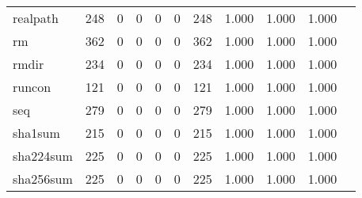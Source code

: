 \begin{longtable}{lp{1.10cm}p{1.10cm}p{1.10cm}p{1.10cm}p{1.10cm}p{1.10cm}p{1.10cm}p{1.10cm}p{1.10cm}p{1.10cm}}
realpath  &                    248 &                                  0 &                                 0 &                                0 &                                 0 &                             248 &                             1.000 &                                 1.000 &                               1.000 \\
rm        &                    362 &                                  0 &                                 0 &                                0 &                                 0 &                             362 &                             1.000 &                                 1.000 &                               1.000 \\
rmdir     &                    234 &                                  0 &                                 0 &                                0 &                                 0 &                             234 &                             1.000 &                                 1.000 &                               1.000 \\
runcon    &                    121 &                                  0 &                                 0 &                                0 &                                 0 &                             121 &                             1.000 &                                 1.000 &                               1.000 \\
seq       &                    279 &                                  0 &                                 0 &                                0 &                                 0 &                             279 &                             1.000 &                                 1.000 &                               1.000 \\
sha1sum   &                    215 &                                  0 &                                 0 &                                0 &                                 0 &                             215 &                             1.000 &                                 1.000 &                               1.000 \\
sha224sum &                    225 &                                  0 &                                 0 &                                0 &                                 0 &                             225 &                             1.000 &                                 1.000 &                               1.000 \\
sha256sum &                    225 &                                  0 &                                 0 &                                0 &                                 0 &                             225 &                             1.000 &                                 1.000 &                               1.000 \\

\end{longtable}
